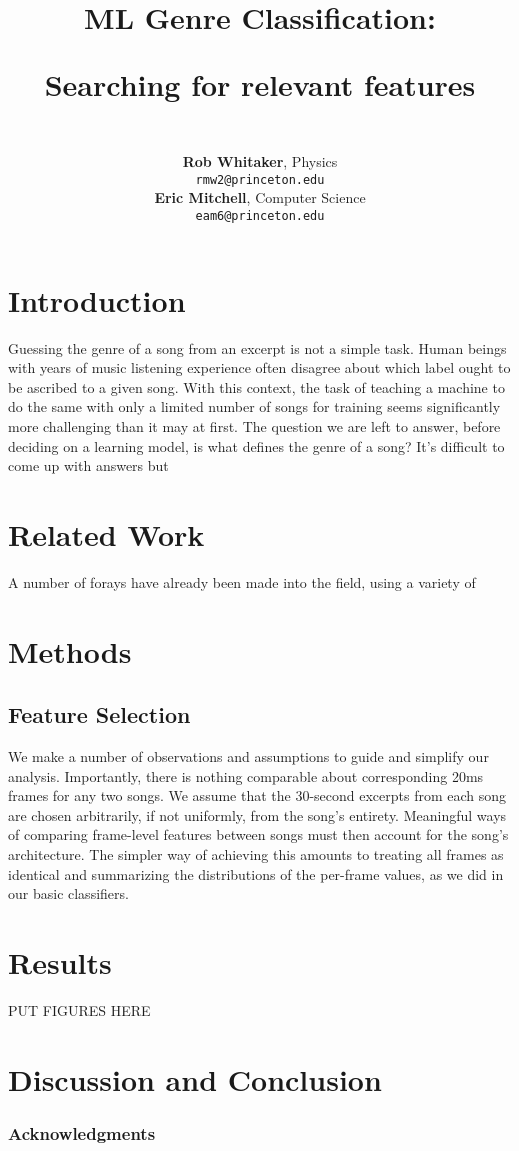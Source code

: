 \documentclass{article} %
\title{ML Genre Classification: \\
\begin{large} Searching for relevant features \end{large} }
\author{\\
\textbf{Rob Whitaker}, 
Physics \\
\texttt{rmw2@princeton.edu} \\
\textbf{Eric Mitchell}, 
Computer Science \\
\texttt{eam6@princeton.edu} \\
}
\begin{document}
\maketitle

\begin{abstract}

\end{abstract}

\section{Introduction}
Guessing the genre of a song from an excerpt is not a simple task.  Human beings with years of music listening experience often disagree about which label ought to be ascribed to a given song.  With this context, the task of teaching a machine to do the same with only a limited number of songs for training seems significantly more challenging than it may at first.  The question we are left to answer, before deciding on a learning model, is what defines the genre of a song?  It's difficult to come up with answers but 

\section{Related Work}
A number of forays have already been made into the field, using a variety of 

\section{Methods}

\subsection{Feature Selection}

We make a number of observations and assumptions to guide and simplify our analysis.  Importantly, there is nothing comparable about corresponding 20ms frames for any two songs.  We assume that the 30-second excerpts from each song are chosen arbitrarily, if not uniformly, from the song's entirety.  Meaningful ways of comparing frame-level features between songs must then account for the song's architecture.  The simpler way of achieving this amounts to treating all frames as identical and summarizing the distributions of the per-frame values, as we did in our basic classifiers.

\section{Results}
PUT FIGURES HERE

\section{Discussion and Conclusion}

\subsubsection*{Acknowledgments}



\end{document}
